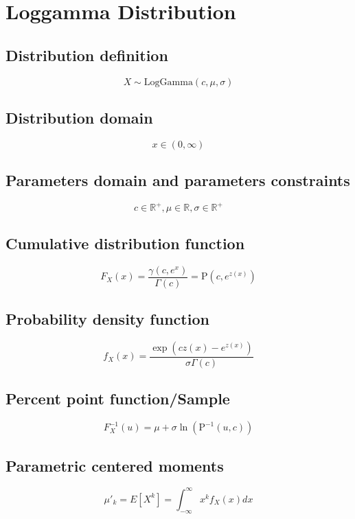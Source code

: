 \documentclass{article}
\begin{document}
\newpage
\section{Loggamma Distribution}
\subsection{Distribution definition}
\begin{equation*} X\sim\mathrm{LogGamma}\left(c,\mu,\sigma\right) \end{equation*}
\subsection{Distribution domain}
\begin{equation*} x\in\left(0,\infty\right) \end{equation*}
\subsection{Parameters domain and parameters constraints}
\begin{equation*} c\in\mathbb{R}^{+}, \mu\in\mathbb{R}, \sigma\in\mathbb{R}^{+} \end{equation*}
\subsection{Cumulative distribution function}
\begin{equation*} F_{X}\left(x\right)=\frac{\gamma\left(c,e^{x}\right)}{\Gamma\left(c\right)}=\text{P}\left(c,e^{z(x)}\right) \end{equation*}
\subsection{Probability density function}
\begin{equation*} f_{X}\left(x\right)=\frac{\exp\left(cz(x)-e^{z(x)}\right)}{\sigma\Gamma\left(c\right)} \end{equation*}
\subsection{Percent point function/Sample}
\begin{equation*} F^{-1}_{X}\left(u\right)=\mu+\sigma\ln\left(\text{P}^{-1}\left(u,c\right)\right) \end{equation*}
\subsection{Parametric centered moments}
\begin{equation*} \mu'_{k}=E[X^k]=\int_{-\infty }^{\infty }x^{k}f_{X}\left(x\right)dx \end{equation*}
\end{document}
